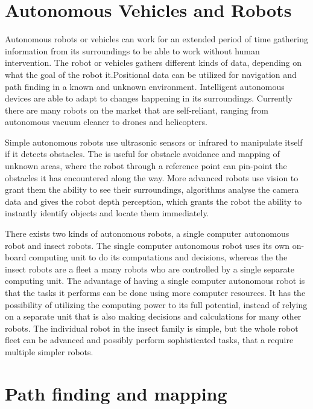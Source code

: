 \clearpage
\section{Autonomous Vehicles and Robots}

Autonomous robots or vehicles can work for an extended period of time gathering information from its surroundings to be able to work without human intervention. The robot or vehicles gathers different kinds of data, depending on what the goal of the robot it.Positional data can be utilized for navigation and path finding in a known and unknown environment. Intelligent autonomous devices are able to adapt to changes happening in its surroundings.
Currently there are many robots on the market that are self-reliant, ranging from autonomous vacuum cleaner to drones and helicopters. \cite{autonomousbasic}

Simple autonomous robots use ultrasonic sensors or infrared to manipulate itself if it detects obstacles. The is useful for obstacle avoidance and mapping of unknown areas, where the robot through a reference point can pin-point the obstacles it has encountered along the way.
More advanced robots use vision to grant them the ability to see their surroundings, algorithms analyse the camera data and gives the robot depth perception, which grants the robot the ability to instantly identify objects and locate them immediately.\cite{obstacles}

There exists two kinds of autonomous robots, a single computer autonomous robot and insect robots. The single computer autonomous robot uses its own on-board computing unit to do its computations and decisions, whereas the the insect robots are a fleet a many robots who are controlled by a single separate computing unit.
The advantage of having a single computer autonomous robot is that the tasks it performs can be done using more computer resources. It has the possibility of utilizing the computing power to its full potential, instead of relying on a separate unit that is also making decisions and calculations for many other robots.
The individual robot in the insect family is simple, but the whole robot fleet can be advanced and possibly perform sophisticated tasks, that a require multiple simpler robots.\cite{singleandinsect}



\section{Path finding and mapping}

